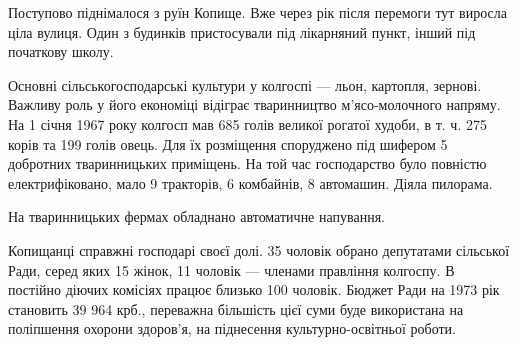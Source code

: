 Поступово піднімалося з руїн Копище. Вже через рік після перемоги тут виросла ціла вулиця. Один з будинків пристосували під лікарняний пункт, інший під початкову школу.

Основні сільськогосподарські культури у колгоспі — льон, картопля, зернові. Важливу роль у його економіці відіграє тваринництво м’ясо-молочного напряму. На 1 січня 1967 року колгосп мав 685 голів великої рогатої худоби, в т. ч. 275 корів та 199 голів овець. Для їх розміщення споруджено під шифером 5 добротних тваринницьких приміщень. На той час господарство було повністю електрифіковано, мало 9 тракторів, 6 комбайнів, 8 автомашин. Діяла пилорама.

На тваринницьких фермах обладнано автоматичне напування.

Копищанці справжні господарі своєї долі. 35 чоловік обрано депутатами сільської Ради, серед яких 15 жінок, 11 чоловік — членами правління колгоспу. В постійно діючих комісіях працює близько 100 чоловік. Бюджет Ради на 1973 рік становить 39 964 крб., переважна більшість цієї суми буде використана на поліпшення охорони здоров’я, на піднесення культурно-освітньої роботи.

